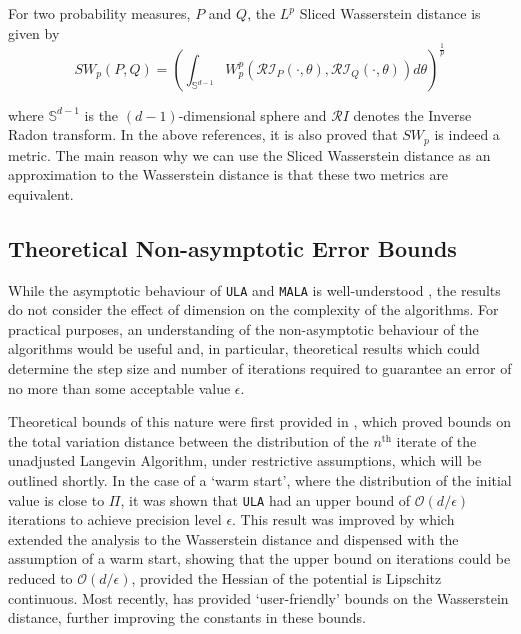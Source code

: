 \begin{defn}
For two probability measures, $P$ and $Q$, the $L^p$ Sliced Wasserstein distance is given by
$$
SW_p(P,Q) = \left(\int_{\mathbb S^{d-1} }  W_p^p\left(\mathcal{RI}_P(\cdot, \theta), \mathcal{RI}_Q(\cdot, \theta) \right) d \theta \right)^{\frac 1 p}
$$
\end{defn}

where $\mathbb S^{d-1}$ is the $(d-1)$-dimensional sphere and $\mathcal RI$ denotes the Inverse Radon transform. In the above references, it is also proved that $SW_p$ is indeed a metric. The main reason why we can use the Sliced Wasserstein distance as an approximation to the Wasserstein distance is that these two metrics are equivalent\cite{Santa}.


\subsection{Theoretical Non-asymptotic Error Bounds}

While the asymptotic behaviour of \texttt{ULA} and \texttt{MALA} is well-understood \cite{RT96}, the results do not consider the effect of dimension on the complexity of the algorithms.  For practical purposes, an understanding of the non-asymptotic behaviour of the algorithms would be useful and, in particular, theoretical results which could determine the step size and number of iterations required to guarantee an error of no more than some acceptable value $\epsilon$.

Theoretical bounds of this nature were first provided in \cite{dalalyan2017theoretical}, which proved bounds on the total variation distance between the distribution of the $n^{\text{th}}$ iterate of the unadjusted Langevin Algorithm, under restrictive assumptions, which will be outlined shortly.  In the case of a `warm start', where the distribution of the initial value is close to $\Pi$, it was shown that \texttt{ULA} had an upper bound of $\mathcal{O}(d/\epsilon)$ iterations to achieve precision level $\epsilon$.  This result was improved by \cite{durmus2016high, durmus2017nonasymptotic} which extended the analysis to the Wasserstein distance and dispensed with the assumption of a warm start, showing that the upper bound on iterations could be reduced to $\mathcal O (d/\epsilon)$, provided the Hessian of the potential is Lipschitz continuous.  Most recently, \cite{dalalyan2019user} has provided `user-friendly' bounds on the Wasserstein distance, further improving the constants in these bounds.

